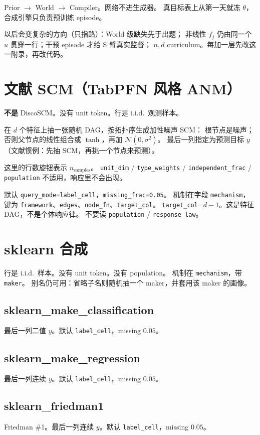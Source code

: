 \documentclass[11pt,a4paper,fontset=none]{ctexart}
\begin{document}
Prior $\to$ World $\to$ Compiler。网络不进生成器。
真目标表上从第一天就冻 $\theta$，合成引擎只负责预训练 episode。

以后会变复杂的方向（只指路）：World 级缺失先于出题；
非线性 $f_j$ 仍由同一个 $u$ 贯穿一行；干预 episode 才给 S 臂真实监督；
$n,d$ curriculum。每加一层先改这一附录，再改代码。

\section{文献 SCM（TabPFN 风格 ANM）}
\label{app:scm}

\textbf{不是} DiscoSCM。没有 unit token。行是 i.i.d.\ 观测样本。

在 $d$ 个特征上抽一张随机 DAG，按拓扑序生成加性噪声 SCM：
根节点是噪声；否则父节点的线性组合或 $\tanh$，再加 $\mathcal{N}(0,\sigma^2)$。
最后一列指定为预测目标 $y$（文献惯例：先抽 SCM，再挑一个节点来预测）。

这里的行数旋钮表示 $n_{\mathrm{samples}}$。
\texttt{unit\_dim} / \texttt{type\_weights} / \texttt{independent\_frac} / \texttt{population}
不适用，响应里不会出现。

默认 \texttt{query\_mode=label\_cell}，\texttt{missing\_frac=0.05}。
机制在字段 \texttt{mechanism}，键为
\texttt{framework}、\texttt{edges}、\texttt{node\_fn}、\texttt{target\_col}。
\texttt{target\_col}=$d-1$。这是特征 DAG，不是个体响应律。
不要读 \texttt{population} / \texttt{response\_law}。

\section{sklearn 合成}
\label{app:sksynth}

行是 i.i.d.\ 样本。没有 unit token。没有 population。
机制在 \texttt{mechanism}，带 \texttt{maker}。
别名仍可用：省略子名则随机抽一个 maker，并套用该 maker 的画像。

\subsection{sklearn\_make\_classification}
最后一列二值 $y$。默认 \texttt{label\_cell}，missing $0.05$。

\subsection{sklearn\_make\_regression}
最后一列连续 $y$。默认 \texttt{label\_cell}，missing $0.05$。

\subsection{sklearn\_friedman1}
Friedman \#1。最后一列连续 $y$。默认 \texttt{label\_cell}，missing $0.05$。
\end{document}
